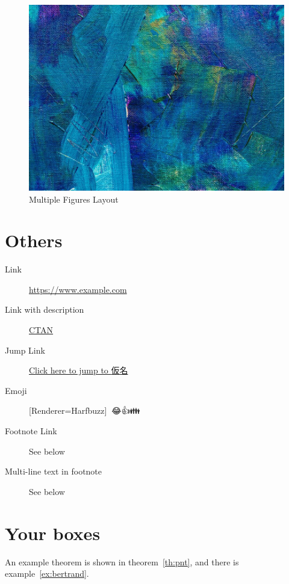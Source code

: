 \documentclass{report}
\newcommand{\emoji}[1]{
  {\setmainfont{Apple Color Emoji}[Renderer=Harfbuzz]{#1}}
}
\let\oldurl\url
\renewcommand{\url}[1]{%
{\lmmono\oldurl{#1}}
}
\theoremstyle{definition}
\begin{document}
\begin{figure}[htbp]
\includegraphics[scale=0.2]{pexels-1509534.jpg}
\caption{Multiple Figures Layout}
\end{figure}


\newpage
\section{Others}

\begin{description}
  \item[Link] \url{https://www.example.com}
  \item[Link with description] \href{https://www.ctan.org}{CTAN}
  \item[Jump Link] \hyperref[sec:kana]{Click here to jump to {仮名}}
  \item[Emoji] \emoji{😶‍🌫️😂👍👪} 
  \item[Footnote Link\footnotemark] See below
  \item[Multi-line text in footnote\footnotemark] See below
\end{description}

\section{Your boxes}
An example theorem is shown in theorem~\ref{th:pnt}, and there is
example~\ref{ex:bertrand}.
\end{document}
